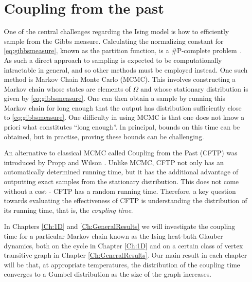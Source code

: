 

\section{Coupling from the past}
	One of the central challenges regarding the Ising model is how to efficiently sample from the Gibbs measure. Calculating the normalizing constant for \eqref{eq:gibbsmeasure}, known as the partition function, is a \#P-complete problem \cite{Jerrum1993-ii}. As such a direct approach to sampling is expected to be computationally intractable in general, and so other methods must be employed instead. One such method is Markov Chain Monte Carlo (MCMC). This involves constructing a Markov chain whose states are elements of $\Omega$ and whose stationary distribution is given by \eqref{eq:gibbsmeasure}. One can then obtain a sample by running this Markov chain for long enough that the output has distribution sufficiently close to \eqref{eq:gibbsmeasure}.
	One difficulty in using MCMC is that one does not know a priori what constitutes ``long enough''. In principal, bounds on this time can be obtained, but in practise, proving these bounds can be challenging.

	An alternative to classical MCMC called Coupling from the Past (CFTP) was introduced by Propp and Wilson \cite{Propp1996-cf}. Unlike MCMC, CFTP not only has an automatically determined running time, but it has the additional advantage of outputting exact samples from the stationary distribution. This does not come without a cost - CFTP has a random running time. Therefore, a key question towards evaluating the effectiveness of CFTP is understanding the distribution of its running time, that is, the \emph{coupling time}.

	In Chapters \ref{Ch:1D} and \ref{Ch:GeneralResults} we will investigate the coupling time for a particular Markov chain known as the Ising heat-bath Glauber dynamics, both on the cycle in Chapter \ref{Ch:1D} and on a certain class of vertex transitive graph in Chapter \ref{Ch:GeneralResults}. Our main result in each chapter will be that, at appropriate temperatures, the distribution of the coupling time converges to a Gumbel distribution as the size of the graph increases. 

